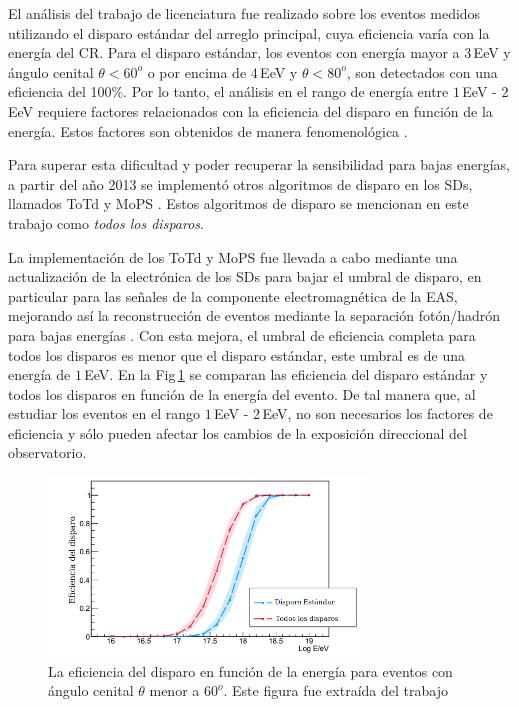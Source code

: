 El análisis del trabajo de licenciatura fue realizado sobre los eventos medidos utilizando el disparo estándar del arreglo principal, cuya eficiencia varía con la energía del CR. Para el disparo estándar, los eventos con energía mayor a $3\,$EeV y ángulo cenital $\theta<60^o$ o  por encima de $4\,$EeV y $\theta<80^o$, son detectados con una eficiencia del 100\%. Por lo tanto, el análisis en el rango de energía entre $1\,$EeV - $2\,$EeV requiere factores relacionados con la eficiencia del disparo en función de la energía. Estos factores son obtenidos de manera fenomenológica \cite{taborda}. 

Para superar esta dificultad y  poder recuperar la sensibilidad para bajas energías, a partir del año 2013  se implementó otros algoritmos de disparo en los SDs, llamados ToTd y MoPS \cite{pierre2013plans}. Estos algoritmos de disparo se mencionan en este trabajo como \textit{todos los disparos}. 

La implementación de los ToTd y MoPS fue llevada a cabo mediante una actualización de la electrónica de los SDs para bajar el umbral de disparo, en particular para las señales de la componente electromagnética de la EAS, mejorando así la reconstrucción de eventos mediante la separación fotón/hadrón para bajas energías  \cite{pierre2013plans}. Con esta mejora, el umbral de eficiencia completa para todos los disparos es menor que el disparo estándar, este umbral es de una energía de $1\,$EeV. En la Fig\,\ref{fig:triggers} se comparan las eficiencia del disparo estándar y todos los disparos en función de la energía del evento. De tal manera que, al estudiar los eventos en el rango $1\,$EeV - $2\,$EeV,  no son necesarios los factores de eficiencia y sólo pueden afectar los cambios de la exposición direccional del observatorio.


\begin{figure}[H]
  \centering
  \includegraphics[width=0.75\textwidth]{comparacion_triggers.png}
  \caption{La eficiencia del disparo en función de la energía para eventos con ángulo cenital $\theta$ menor a $60^o$. Este figura fue extraída del trabajo \cite{triggers_ref}}
  \label{fig:triggers}
\end{figure}


